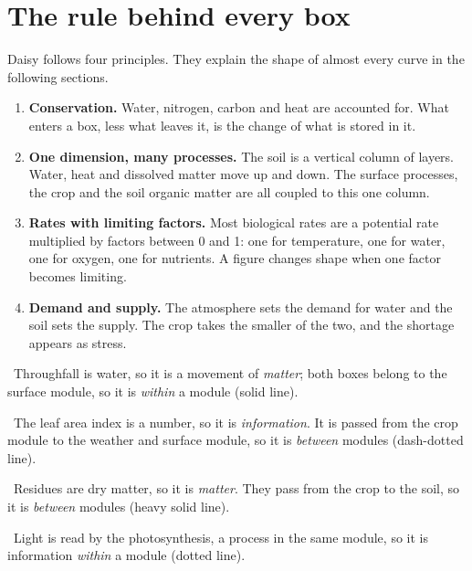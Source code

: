 \section{The rule behind every box}
Daisy follows four principles. They explain the shape of almost every curve in the following sections.
\begin{enumerate}
\item \textbf{Conservation.} Water, nitrogen, carbon and heat are accounted for. What enters a box, less what leaves it, is the change of what is stored in it.
\item \textbf{One dimension, many processes.} The soil is a vertical column of layers. Water, heat and dissolved matter move up and down. The surface processes, the crop and the soil organic matter are all coupled to this one column.
\item \textbf{Rates with limiting factors.} Most biological rates are a potential rate multiplied by factors between 0 and 1: one for temperature, one for water, one for oxygen, one for nutrients. A figure changes shape when one factor becomes limiting.
\item \textbf{Demand and supply.} The atmosphere sets the demand for water and the soil sets the supply. The crop takes the smaller of the two, and the shortage appears as stress.
\end{enumerate}

\sol {}
\par{}\ Throughfall is water, so it is a movement of \emph{matter}; both boxes belong to the surface module, so it is \emph{within} a module (solid line).
\par{}\ The leaf area index is a number, so it is \emph{information}. It is passed from the crop module to the weather and surface module, so it is \emph{between} modules (dash-dotted line).
\par{}\ Residues are dry matter, so it is \emph{matter}. They pass from the crop to the soil, so it is \emph{between} modules (heavy solid line).
\par{}\ Light is read by the photosynthesis, a process in the same module, so it is information \emph{within} a module (dotted line). \finans

